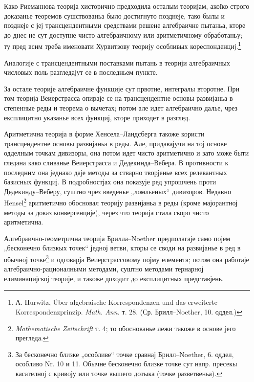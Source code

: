 ﻿\documentclass[11pt]{article}
\begin{document}
Како Риеманнова теорија хисторично предходила осталым теоријам, акоľко строго доказанье теоремов сушствованьа было достигнуто позднеје, тако былы и позднеје с јеј трансцендентными средствами решене алгебраичне пытаньа, кторе до днес не сут доступне чисто алгебраичному или аритметичному обработаньу; ту пред всим треба именовати Хурвитзову теорију особливых кореспонденциј.\footnote{А. Hurwitz, Über algebraische Korrespondenzen und das erweiterte Korrespondenzprinzip. \emph{Math. Ann.} т. 28. (Ср. Брилл--Noether, 10. оддел.)}

Аналогије с трансцендентными поставками пытань в теорији алгебраичных числовых поль разгледајут се в последньем пункте.

За остале теорије алгебраичне функције сут првотне, интегралы второтне. При том теорија Веиерстрасса опираје се на трансцендентне основы развијаньа в степенные реды и теорема о вычетах; потом але идет алгебраично далье, чрез експлицитно указанье всех функциј, кторе приходет в разглед.

Аритметична теорија в форме Хенсела--Ландсберга такоже користи трансцендентне основы развијаньа в реды. Але, придавајучи на тој основе одделным точкам дивизоры, она потом идет чисто аритметично и зато може быти гледана како сливанье Веиерстрасса и Дедекинда--Вебера. В противности к последним она једнако даје методы за стварно творјенье всех релевантных базисных функциј. В подробностјах она показује ред упрошчень проти Дедекинду--Веберу, суштно чрез введенье „ломльеных“ дивизоров. Недавно Hensel\footnote{\emph{Mathematische Zeitschrift} т. 4; то обоснованье лежи такоже в основе јего прегледа.} аритметично обосновал теорију развијаньа в реды (кроме мајорантној методы за доказ конвергенције), через что теорија стала скоро чисто аритметична.

Алгебраично-геометрична теорија Брилла--Noether предполагаје само појем „бесконечно близкых точек“ једној ветви, кторы се своди на развијанье в ред в обычној точке\footnote{За бесконечно близке „особливе“ точке сравнај Брилл--Noether, 6. оддел, особливо Nr. 10 и 11. Обычне бесконечно близке точке сут напр. пресекы касателној с кривоју или точке вышего дотыка (точке разветвеньа).} и одговарја Веиерстрассовому појму елемента; потом она работаје алгебраично-рационалными методами, суштно методами тернарној елиминацијској теорије, и такоже доходит до експлицитных представјень.
\end{document}
